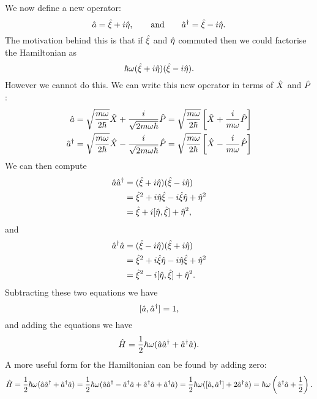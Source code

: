     We now define a new operator:
    \[\hat{a} = \hat{\xi} + i\hat{\eta},\qquad\text{and}\qquad \hat{a}^\dagger = \hat{\xi} - i\hat{\eta}.\]
    The motivation behind this is that if \(\hat{\xi}\) and \(\hat{\eta}\) commuted then we could factorise the Hamiltonian as
    \[\hbar\omega(\hat{\xi} + i\hat{\eta})(\hat{\xi} - i\hat{\eta}).\]
    However we cannot do this.
    We can write this new operator in terms of \(\hat{X}\) and \(\hat{P}\):
    \begin{align*}
        \hat{a} &= \sqrt{\frac{m\omega}{2\hbar}} \hat{X} + \frac{i}{\sqrt{2m\omega\hbar}} \hat{P} = \sqrt{\frac{m\omega}{2\hbar}}\left[\hat{X} + \frac{i}{m\omega}\hat{P}\right]\\
        \hat{a}^\dagger &= \sqrt{\frac{m\omega}{2\hbar}} \hat{X} - \frac{i}{\sqrt{2m\omega\hbar}} \hat{P} = \sqrt{\frac{m\omega}{2\hbar}}\left[\hat{X} - \frac{i}{m\omega}\hat{P}\right]\\
    \end{align*}
    We can then compute
    \begin{align*}
        \hat{a}\hat{a}^\dagger &= (\hat{\xi} + i\hat{\eta})(\hat{\xi} - i\hat{\eta})\\
        &= \hat{\xi}^2 + i\hat{\eta}\hat{\xi} - i\hat{\xi}\hat{\eta} + \hat{\eta}^2\\
        &= \hat{\xi} + i[\hat{\eta}, \hat{\xi}] + \hat{\eta}^2,
    \end{align*}
    and
    \begin{align*}
        \hat{a}^\dagger\hat{a} &= (\hat{\xi} - i\hat{\eta})(\hat{\xi} + i\hat{\eta})\\
        &= \hat{\xi}^2 + i\hat{\xi}\hat{\eta} - i\hat{\eta}\hat{\xi} + \hat{\eta}^2\\
        &= \hat{\xi}^2 - i[\hat{\eta}, \hat{\xi}] + \hat{\eta}^2.
    \end{align*}
    Subtracting these two equations we have
    \[[\hat{a}, \hat{a}^\dagger] = 1,\]
    and adding the equations we have
    \[\hat{H} = \frac{1}{2}\hbar\omega(\hat{a}\hat{a}^\dagger + \hat{a}^\dagger\hat{a}).\]
    A more useful form for the Hamiltonian can be found by adding zero:
    \[\hat{H} = \frac{1}{2}\hbar\omega(\hat{a}\hat{a}^\dagger + \hat{a}^\dagger\hat{a}) = \frac{1}{2}\hbar\omega(\hat{a}\hat{a}^\dagger - \hat{a}^\dagger\hat{a} + \hat{a}^\dagger\hat{a}+ \hat{a}^\dagger\hat{a}) = \frac{1}{2}\hbar\omega([\hat{a}, \hat{a}^\dagger] + 2\hat{a}^\dagger\hat{a}) = \hbar\omega\left(\hat{a}^\dagger\hat{a} + \frac{1}{2}\right).\]
    
